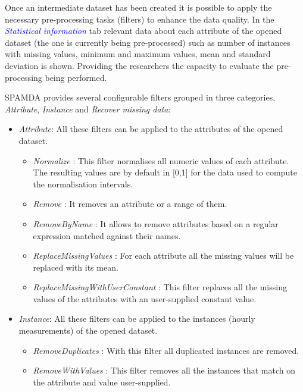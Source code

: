 \begin{onehalfspace}
				Once an intermediate dataset has been created it is possible to apply the necessary pre-processing tasks (filters) to enhance the data quality. In the \textcolor{blue}{\textit{Statistical information}} tab relevant data about each attribute of the opened dataset (the one is currently being pre-processed) such as number of instances with missing values, minimum and maximum values, mean and standard deviation is shown. Providing the researchers the capacity to evaluate the pre-processing being performed.
				
				SPAMDA provides several configurable filters grouped in three categories, \textit{Attribute}, \textit{Instance} and \textit{Recover missing data}:
				
				\begin{itemize}
					\item \textit{Attribute}: All these filters can be applied to the attributes of the opened dataset.
						\begin{itemize}
							\item \textit{Normalize} \cite{WEKA_Filter_Normalize}: This filter normalises all numeric values of each attribute. The resulting values are by default in [0,1] for the data used to compute the normalisation intervals.
							\item \textit{Remove} \cite{WEKA_Filter_Remove}: It removes an attribute or a range of them.
							\item \textit{RemoveByName} \cite{WEKA_Filter_RemoveByName}: It allows to remove attributes based on a regular expression matched against their names.
							\item \textit{ReplaceMissingValues} \cite{WEKA_Filter_ReplaceMissingValues}: For each attribute all the missing values will be replaced with its mean.
							\item \textit{ReplaceMissingWithUserConstant} \cite{WEKA_Filter_ReplaceMissingWithUserConstant}: This filter replaces all the missing values of the attributes with an user-supplied constant value.
						\end{itemize}
				 \item \textit{Instance}: All these filters can be applied to the instances (hourly measurements) of the opened dataset.
					\begin{itemize}
						\item \textit{RemoveDuplicates} \cite{WEKA_Filter_RemoveDuplicates}: With this filter all duplicated instances are removed.
						\item \textit{RemoveWithValues} \cite{WEKA_Filter_RemoveWithValues}: This filter removes all the instances that match on the attribute and value user-supplied.

\end{itemize}
\end{itemize}
\end{onehalfspace}
